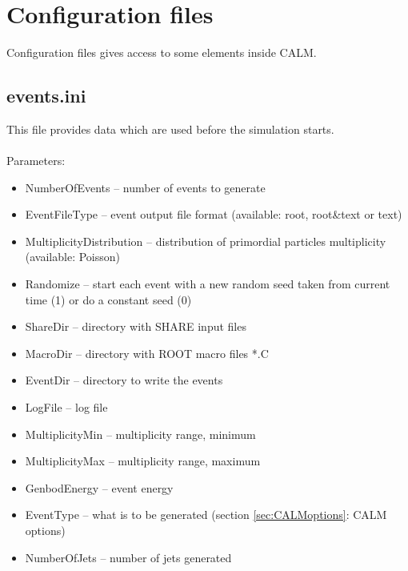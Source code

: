 \newpage
\section{Configuration files}
Configuration files gives access to some elements inside CALM.
\subsection{events.ini}
This file provides data which are used before the simulation starts.\\\\
Parameters:
\begin{itemize}
    \item NumberOfEvents -- number of events to generate 
    \item EventFileType -- event output file format (available: root, root\&text or text)
    \item MultiplicityDistribution -- distribution of primordial particles multiplicity (available: Poisson)
    \item Randomize -- start each event with a new random seed taken from current time (1) or do a constant seed (0)
    \item ShareDir -- directory with SHARE input files
    \item MacroDir -- directory with ROOT macro files *.C
    \item EventDir -- directory to write the events
    \item LogFile -- log file
    \item MultiplicityMin -- multiplicity range, minimum
    \item MultiplicityMax -- multiplicity range, maximum
    \item GenbodEnergy -- event energy
    \item EventType -- what is to be generated (section \ref{sec:CALMoptions}: CALM options)
    \item NumberOfJets -- number of jets generated
\end{itemize}

\newpage
